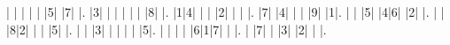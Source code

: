 \begin{sudoku-block}| | | | | |5| |7| |.
|3| | | | | | |8| |.
|1|4| | | |2| | | |.
|7| |4| | | |9| |1|.
| | |5| |4|6| |2| |.
| | |8|2| | | |5| |.
| | |3| | | | | |5|.
| | | | |6|1|7| | |.
| |7| | |3| |2| | |.
\end{sudoku-block}